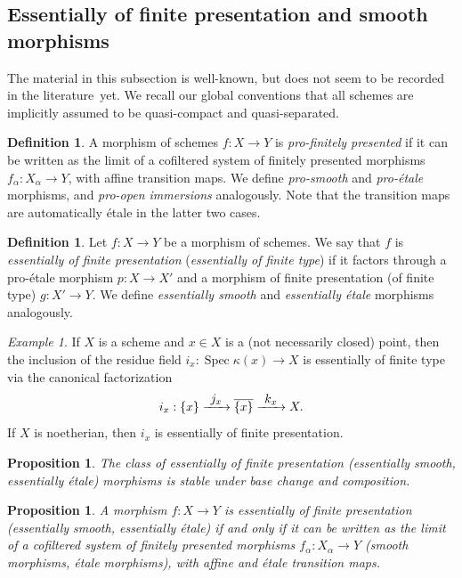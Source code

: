 \documentclass[JEP,XML,SOM,Unicode]{cedram}
\def\To#1{\mathchoice{\xrightarrow{\textstyle\kern4pt#1\kern3pt}}{\stackrel{#1}{\longrightarrow}}{}{}}
\DeclareMathOperator{\spec}{Spec}
\newtheorem{prop}[thm]{Proposition}
\theoremstyle{remark}
\newtheorem{ex}[thm]{Example}
\theoremstyle{definition}
\newtheorem{df}[thm]{Definition}
\numberwithin{equation}{thm}
\begin{document}
\subsection{Essentially of finite presentation and smooth morphisms}

The material in this subsection is well-known, but does not seem to be recorded in the literature~yet.
We recall our global conventions that all schemes are implicitly assumed to be quasi-compact and quasi-separated.

\begin{df}\label{df:pro-etale}
A morphism of schemes $f : X \to Y$ is \emph{pro-finitely presented} if it can be written as the limit of a cofiltered system of finitely presented morphisms $f_\alpha : X_\alpha \to Y$, with affine transition maps.
We define \emph{pro-smooth} and \emph{pro-étale} morphisms, and \emph{pro-open immersions} analogously.
Note that the transition maps are automatically étale in the latter two cases.
\end{df}

\begin{df}\label{df:efp}
Let $f : X \to Y$ be a morphism of schemes.
We say that $f$ is \emph{essentially of finite presentation} (\resp \emph{essentially of finite type}) if it factors through a pro-étale morphism $p : X \to X'$ and a morphism of finite presentation (\resp of finite type) $g : X' \to Y$.
We define \emph{essentially smooth} and \emph{essentially étale} morphisms analogously.
\end{df}

\begin{ex}\label{ex:residue efp}
If $X$ is a scheme and $x \in X$ is a (not necessarily closed) point, then the inclusion of the residue field $i_x : \spec{\kappa(x)} \to X$ is essentially of finite type via the canonical factorization
\[
i_x : \{x\}
\To{j_x} \overline{\{x\}}
\To{k_x} X.
\]
If $X$ is noetherian, then $i_x$ is essentially of finite presentation.
\end{ex}

\begin{prop}\label{prop:efp compose}
The class of essentially of finite presentation (\resp essentially smooth, essentially étale) morphisms is stable under base change and composition.
\end{prop}

\begin{prop}\label{prop:pro-fp=efp}
A morphism $f : X \to Y$ is essentially of finite presentation (\resp essentially smooth, essentially étale) if and only if it can be written as the limit of a cofiltered system of finitely presented morphisms $f_\alpha : X_\alpha \to Y$ (\resp smooth morphisms, étale morphisms), with affine and \emph{étale} transition maps.
\end{prop}
\end{document}
